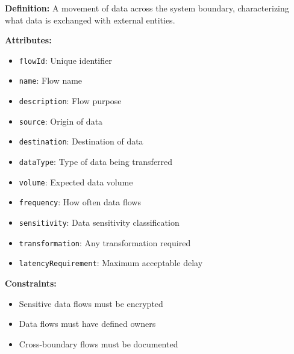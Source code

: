 \documentclass[11pt,letterpaper]{article}
\begin{document}
\begin{definitionbox}
\textbf{Definition:} A movement of data across the system boundary, characterizing what data is exchanged with external entities.

\textbf{Attributes:}
\begin{itemize}[nosep]
    \item \texttt{flowId}: Unique identifier
    \item \texttt{name}: Flow name
    \item \texttt{description}: Flow purpose
    \item \texttt{source}: Origin of data
    \item \texttt{destination}: Destination of data
    \item \texttt{dataType}: Type of data being transferred
    \item \texttt{volume}: Expected data volume
    \item \texttt{frequency}: How often data flows
    \item \texttt{sensitivity}: Data sensitivity classification
    \item \texttt{transformation}: Any transformation required
    \item \texttt{latencyRequirement}: Maximum acceptable delay
\end{itemize}

\textbf{Constraints:}
\begin{itemize}[nosep]
    \item Sensitive data flows must be encrypted
    \item Data flows must have defined owners
    \item Cross-boundary flows must be documented
\end{itemize}
\end{definitionbox}
\end{document}
